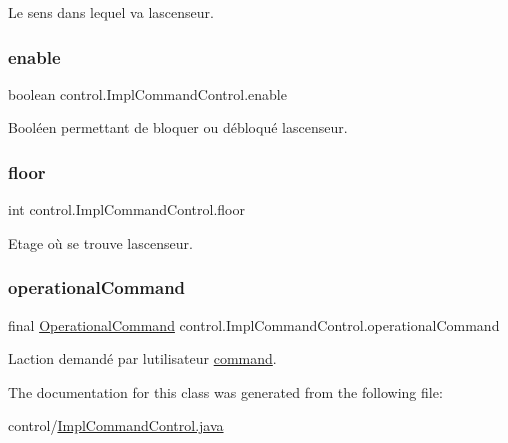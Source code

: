 Le sens dans lequel va l\textquotesingle{}ascenseur. 

\mbox{\label{classcontrol_1_1_impl_command_control_a80ffb0738b94ae89c8b32d60f9f2fcd0}} 
\subsubsection{\texorpdfstring{enable}{enable}}
{\footnotesize\ttfamily boolean control.\+Impl\+Command\+Control.\+enable\hspace{0.3cm}{\ttfamily [private]}}



Booléen permettant de bloquer ou débloqué l\textquotesingle{}ascenseur. 

\mbox{\label{classcontrol_1_1_impl_command_control_acbd6195b1d21b55b2c9c96d144f98671}} 
\subsubsection{\texorpdfstring{floor}{floor}}
{\footnotesize\ttfamily int control.\+Impl\+Command\+Control.\+floor\hspace{0.3cm}{\ttfamily [private]}}



Etage où se trouve l\textquotesingle{}ascenseur. 

\mbox{\label{classcontrol_1_1_impl_command_control_adbe2ee9057a11e4d2408947f5ff83cd5}} 
\subsubsection{\texorpdfstring{operationalCommand}{operationalCommand}}
{\footnotesize\ttfamily final \mbox{\hyperlink{interfacecontrol_1_1_operational_command}{Operational\+Command}} control.\+Impl\+Command\+Control.\+operational\+Command\hspace{0.3cm}{\ttfamily [private]}}



L\textquotesingle{}action demandé par l\textquotesingle{}utilisateur \mbox{\hyperlink{namespacecontrol_1_1command}{command}}. 



The documentation for this class was generated from the following file\+:\begin{DoxyCompactItemize}
\item 
control/\mbox{\hyperlink{_impl_command_control_8java}{Impl\+Command\+Control.\+java}}\end{DoxyCompactItemize}
